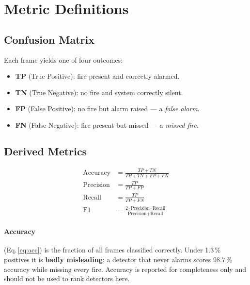 \documentclass[11pt, a4paper]{article}
\begin{document}
\section{Metric Definitions}

\subsection{Confusion Matrix}

Each frame yields one of four outcomes:

\begin{itemize}[leftmargin=2em]
    \item \textbf{TP} (True Positive): fire present and correctly alarmed.
    \item \textbf{TN} (True Negative): no fire and system correctly silent.
    \item \textbf{FP} (False Positive): no fire but alarm raised — a \emph{false alarm}.
    \item \textbf{FN} (False Negative): fire present but missed — a \emph{missed fire}.
\end{itemize}

\subsection{Derived Metrics}

\begin{align}
    \text{Accuracy}  &= \frac{TP + TN}{TP + TN + FP + FN} \label{eq:acc}  \\[6pt]
    \text{Precision} &= \frac{TP}{TP + FP}                \label{eq:prec} \\[6pt]
    \text{Recall}    &= \frac{TP}{TP + FN}                \label{eq:rec}  \\[6pt]
    \text{F1}        &= \frac{2 \cdot \text{Precision} \cdot \text{Recall}}
                              {\text{Precision} + \text{Recall}}            \label{eq:f1}
\end{align}

\paragraph{Accuracy} (Eq.\,\ref{eq:acc}) is the fraction of all frames classified
correctly.  Under 1.3\,\% positives it is \textbf{badly misleading}: a detector that
never alarms scores $98.7\,\%$ accuracy while missing every fire.  Accuracy is reported
for completeness only and should not be used to rank detectors here.
\end{document}
